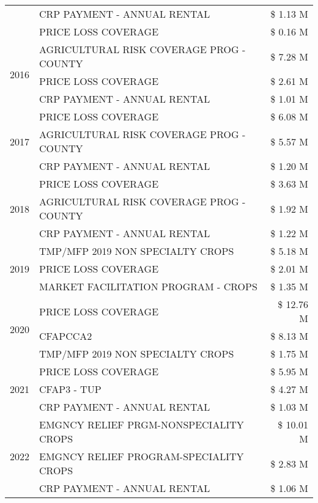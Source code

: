 \begin{tabular}{llr}
 & CRP PAYMENT - ANNUAL RENTAL & \$ 1.13 M \\
 & PRICE LOSS COVERAGE & \$ 0.16 M \\
\cline{1-3}
\multirow[t]{3}{*}{2016} & AGRICULTURAL RISK COVERAGE PROG - COUNTY & \$ 7.28 M \\
 & PRICE LOSS COVERAGE & \$ 2.61 M \\
 & CRP PAYMENT - ANNUAL RENTAL & \$ 1.01 M \\
\cline{1-3}
\multirow[t]{3}{*}{2017} & PRICE LOSS COVERAGE & \$ 6.08 M \\
 & AGRICULTURAL RISK COVERAGE PROG - COUNTY & \$ 5.57 M \\
 & CRP PAYMENT - ANNUAL RENTAL & \$ 1.20 M \\
\cline{1-3}
\multirow[t]{3}{*}{2018} & PRICE LOSS COVERAGE & \$ 3.63 M \\
 & AGRICULTURAL RISK COVERAGE PROG - COUNTY & \$ 1.92 M \\
 & CRP PAYMENT - ANNUAL RENTAL & \$ 1.22 M \\
\cline{1-3}
\multirow[t]{3}{*}{2019} & TMP/MFP 2019 NON SPECIALTY CROPS & \$ 5.18 M \\
 & PRICE LOSS COVERAGE & \$ 2.01 M \\
 & MARKET FACILITATION PROGRAM - CROPS & \$ 1.35 M \\
\cline{1-3}
\multirow[t]{3}{*}{2020} & PRICE LOSS COVERAGE & \$ 12.76 M \\
 & CFAPCCA2 & \$ 8.13 M \\
 & TMP/MFP 2019 NON SPECIALTY CROPS & \$ 1.75 M \\
\cline{1-3}
\multirow[t]{3}{*}{2021} & PRICE LOSS COVERAGE & \$ 5.95 M \\
 & CFAP3 - TUP & \$ 4.27 M \\
 & CRP PAYMENT - ANNUAL RENTAL & \$ 1.03 M \\
\cline{1-3}
\multirow[t]{3}{*}{2022} & EMGNCY RELIEF PRGM-NONSPECIALITY CROPS & \$ 10.01 M \\
 & EMGNCY RELIEF PROGRAM-SPECIALITY CROPS & \$ 2.83 M \\
 & CRP PAYMENT - ANNUAL RENTAL & \$ 1.06 M \\
\cline{1-3}
\bottomrule
\end{tabular}
